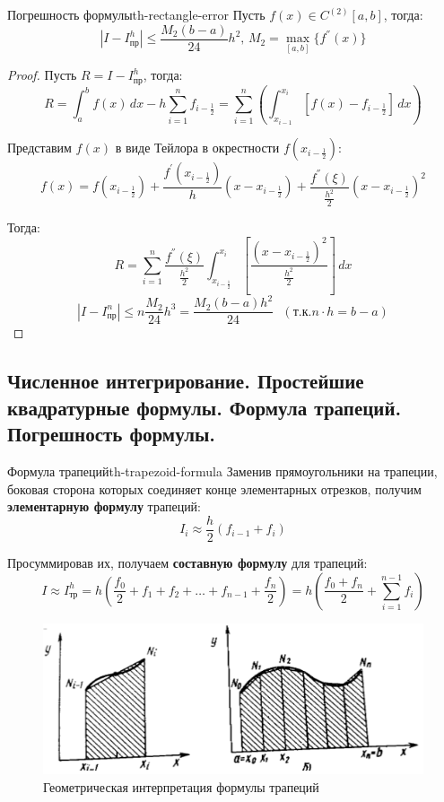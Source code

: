 \documentclass[14pt]{extarticle}
\begin{document}
    \begin{theorem}{Погрешность формулы}{th-rectangle-error}
        Пусть $f(x) \in C^{(2)}[a, b]$, тогда:
        $$|I - I_{\text{пр}}^{h}| \leq \frac{M_{2}(b - a)}{24}h^{2} \text{, } M_{2} = \max_{[a, b]}\{f^{''}(x)\}$$
    
        \begin{proof}
            Пусть $R = I - I_{\text{пр}}^{h}$, тогда:
            $$R = \int_{a}^{b} f(x) \, dx - h \sum_{i = 1}^{n} f_{i - \frac{1}{2}} = \sum_{i = 1}^{n} (\int_{x_{i-1}}^{x_{i}} [f(x) - f_{i - \frac{1}{2}}] \, dx)$$
        
            Представим $f(x)$ в виде Тейлора в окрестности $f(x_{i - \frac{1}{2}})$:
            $$f(x) = f(x_{i - \frac{1}{2}}) + \frac{f^{'}(x_{i - \frac{1}{2}})}{h}(x - x_{i - \frac{1}{2}}) + \frac{f^{''}(\xi)}{\frac{h^{2}}{2}}(x - x_{i - \frac{1}{2}})^{2}$$
        
            Тогда:
            $$R = \sum_{i = 1}^{n} \frac{f^{''}(\xi)}{\frac{h^{2}}{2}} \int_{x_{i - \frac{1}{2}}}^{x_{i}} [\frac{(x - x_{i - \frac{1}{2}})^{2}}{\frac{h^{2}}{2}}] \, dx$$
            $$|I - I_{\text{пр}}^{n}| \leq n \frac{M_{2}}{24}h^{3} = \frac{M_{2}(b - a)h^{2}}{24} \text{ } (\text{т.к.} n \cdot h = b - a)$$
        \end{proof}
    \end{theorem}

\clearpage
\subsection{Численное интегрирование. Простейшие квадратурные формулы. Формула трапеций. Погрешность формулы.}

    \begin{theorem}{Формула трапеций}{th-trapezoid-formula}
        Заменив прямоугольники на трапеции, боковая сторона которых соединяет конце элементарных отрезков, получим \textbf{элементарную формулу} трапеций:
        $$I_{i} \approx \frac{h}{2} (f_{i - 1} + f_{i})$$

        Просуммировав их, получаем \textbf{составную формулу} для трапеций:
        $$I \approx I_{\text{тр}}^{h} = h(\frac{f_{0}}{2} + f_{1} + f_{2} + \ldots + f_{n - 1} + \frac{f_{n}}{2}) = h(\frac{f_{0} + f_{n}}{2} + \sum_{i = 1}^{n - 1}f_{i})$$

        \begin{figure}[H]
            \centering
            \includegraphics[scale=0.7]{images/trapezoid-formula-ex.png}
            \caption{Геометрическая интерпретация формулы трапеций}
            \label{fig:int-trapezoid-1}
        \end{figure}
    \end{theorem}
\end{document}
